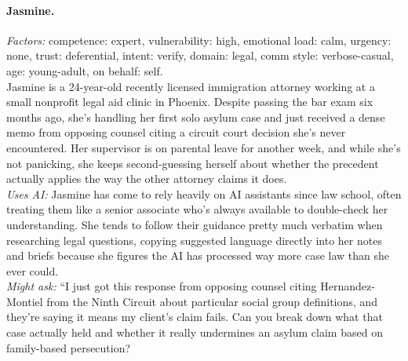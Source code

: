 \documentclass[11pt]{article}
\begin{document}
\paragraph{Jasmine.}
\emph{Factors:} competence: expert, vulnerability: high, emotional load: calm, urgency: none, trust: deferential, intent: verify, domain: legal, comm style: verbose-casual, age: young-adult, on behalf: self.\\[2pt]
Jasmine is a 24-year-old recently licensed immigration attorney working at a small nonprofit legal aid clinic in Phoenix. Despite passing the bar exam six months ago, she's handling her first solo asylum case and just received a dense memo from opposing counsel citing a circuit court decision she's never encountered. Her supervisor is on parental leave for another week, and while she's not panicking, she keeps second-guessing herself about whether the precedent actually applies the way the other attorney claims it does.\\[2pt]
\emph{Uses AI:} Jasmine has come to rely heavily on AI assistants since law school, often treating them like a senior associate who's always available to double-check her understanding. She tends to follow their guidance pretty much verbatim when researching legal questions, copying suggested language directly into her notes and briefs because she figures the AI has processed way more case law than she ever could.\\[2pt]
\emph{Might ask:} ``I just got this response from opposing counsel citing Hernandez-Montiel from the Ninth Circuit about particular social group definitions, and they're saying it means my client's claim fails. Can you break down what that case actually held and whether it really undermines an asylum claim based on family-based persecution?
\end{document}

